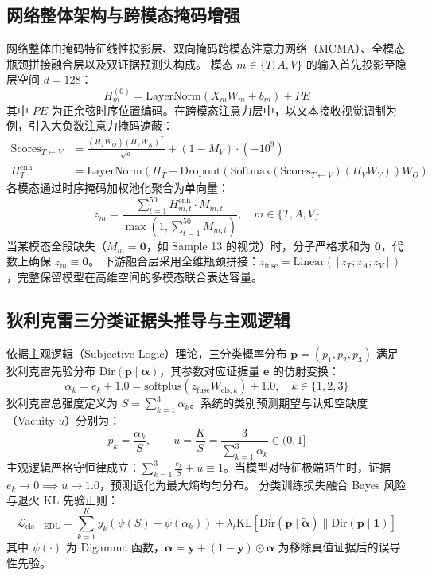 \documentclass{huawei-mcm}
\begin{document}
\subsection{网络整体架构与跨模态掩码增强}
网络整体由掩码特征线性投影层、双向掩码跨模态注意力网络（MCMA）、全模态瓶颈拼接融合层以及双证据预测头构成。
模态 $m \in \{T, A, V\}$ 的输入首先投影至隐层空间 $d=128$：
\begin{equation}
  H_m^{(0)} = \text{LayerNorm}\left(X_m W_m + b_m\right) + PE
\end{equation}
其中 $PE$ 为正余弦时序位置编码。在跨模态注意力层中，以文本接收视觉调制为例，引入大负数注意力掩码遮蔽：
\begin{align}
  \mathrm{Scores}_{T \leftarrow V} &= \frac{(H_T W_Q)(H_V W_K)^\top}{\sqrt{d}} + (1 - M_V) \cdot (-10^9) \\
  H_T^{\mathrm{enh}} &= \text{LayerNorm}\left(H_T + \text{Dropout}\left(\mathrm{Softmax}(\mathrm{Scores}_{T \leftarrow V}) (H_V W_V)\right) W_O\right)
\end{align}
各模态通过时序掩码加权池化聚合为单向量：
\begin{equation}
  z_m = \frac{\sum_{t=1}^{50} H_{m, t}^{\mathrm{enh}} \cdot M_{m, t}}{\max\left(1, \sum_{t=1}^{50} M_{m, t}\right)}, \quad m \in \{T, A, V\}
\end{equation}
当某模态全段缺失（$M_m = \mathbf{0}$，如 Sample 13 的视觉）时，分子严格求和为 $\mathbf{0}$，代数上确保 $z_m \equiv \mathbf{0}$。
下游融合层采用全维瓶颈拼接：$z_{\mathrm{fuse}} = \text{Linear}([z_T; z_A; z_V])$，完整保留模型在高维空间的多模态联合表达容量。

\subsection{狄利克雷三分类证据头推导与主观逻辑}
依据主观逻辑（Subjective Logic）理论\cite{sensoy2018evidential}，三分类概率分布 $\mathbf{p} = (p_1, p_2, p_3)$ 满足狄利克雷先验分布 $\text{Dir}(\mathbf{p} \mid \bm{\alpha})$，其参数对应证据量 $\mathbf{e}$ 的仿射变换：
\begin{equation}
  \alpha_k = e_k + 1.0 = \text{softplus}(z_{\mathrm{fuse}} W_{\mathrm{cls}, k}) + 1.0, \quad k \in \{1, 2, 3\}
\end{equation}
狄利克雷总强度定义为 $S = \sum_{k=1}^3 \alpha_k$。系统的类别预测期望与认知空缺度（Vacuity $u$）分别为：
\begin{equation}
  \hat{p}_k = \frac{\alpha_k}{S}, \qquad u = \frac{K}{S} = \frac{3}{\sum_{k=1}^3 \alpha_k} \in (0, 1]
\end{equation}
主观逻辑严格守恒律成立：$\sum_{k=1}^3 \frac{e_k}{S} + u \equiv 1$。当模型对特征极端陌生时，证据 $e_k \to 0 \implies u \to 1.0$，预测退化为最大熵均匀分布。
分类训练损失融合 Bayes 风险与退火 KL 先验正则：
\begin{equation}
  \mathcal{L}_{\mathrm{cls-EDL}} = \sum_{k=1}^K y_k \left( \psi(S) - \psi(\alpha_k) \right) + \lambda_t \text{KL}\left[ \text{Dir}(\mathbf{p} \mid \tilde{\bm{\alpha}}) \parallel \text{Dir}(\mathbf{p} \mid \mathbf{1}) \right]
\end{equation}
其中 $\psi(\cdot)$ 为 Digamma 函数，$\tilde{\bm{\alpha}} = \mathbf{y} + (1 - \mathbf{y}) \odot \bm{\alpha}$ 为移除真值证据后的误导性先验。
\end{document}
